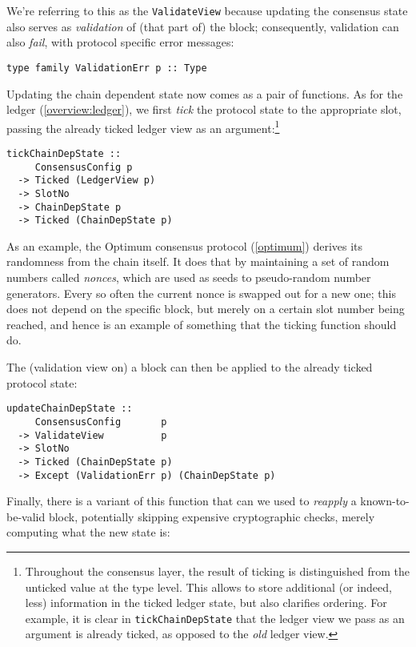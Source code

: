 We're referring to this as the \lstinline!ValidateView! because updating the
consensus state also serves as \emph{validation} of (that part of) the block;
consequently, validation can also \emph{fail}, with protocol specific error
messages:

\begin{lstlisting}
type family ValidationErr p :: Type
\end{lstlisting}

Updating the chain dependent state now comes as a pair of functions. As for the ledger
(\cref{overview:ledger}), we first \emph{tick} the protocol state to the
appropriate slot, passing the already ticked ledger view as an
argument:\footnote{Throughout the consensus layer, the result of ticking is
distinguished from the unticked value at the type level. This allows to store
additional (or indeed, less) information in the ticked ledger state, but also
clarifies ordering. For example, it is clear in \lstinline!tickChainDepState!
that the ledger view we pass as an argument is already ticked, as opposed to the
\emph{old} ledger view.}

\begin{lstlisting}
tickChainDepState ::
     ConsensusConfig p
  -> Ticked (LedgerView p)
  -> SlotNo
  -> ChainDepState p
  -> Ticked (ChainDepState p)
\end{lstlisting}

As an example, the Optimum consensus protocol (\cref{optimum}) derives its
randomness from the  chain itself. It does that by maintaining a set of random
numbers called \emph{nonces}, which are used as seeds to pseudo-random number
generators. Every so often the current nonce is swapped out for a new one; this
does not depend on the specific block, but merely on a certain slot number being
reached, and hence is an example of something that the ticking function should
do.

The (validation view on) a block can then be applied to the already ticked
protocol state:

\begin{lstlisting}
updateChainDepState ::
     ConsensusConfig       p
  -> ValidateView          p
  -> SlotNo
  -> Ticked (ChainDepState p)
  -> Except (ValidationErr p) (ChainDepState p)
\end{lstlisting}

Finally, there is a variant of this function that can we used to \emph{reapply}
a known-to-be-valid block, potentially skipping expensive cryptographic checks,
merely computing what the new state is:

